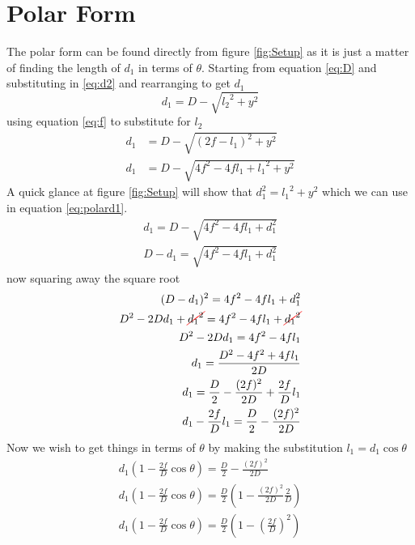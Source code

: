 \documentclass[a5paper,12pt]{article}
\begin{document}
\section{Polar Form}
The polar form can be found directly from figure \ref{fig:Setup} as it is just a matter of finding the length of $d_1$ in terms of $\theta$.
Starting from equation \ref{eq:D} and substituting in \ref{eq:d2} and rearranging to get $d_1$
\begin{equation}
d_1=D-\sqrt{{l_2}^2+y^2} 
\end{equation}
using equation \ref{eq:f} to substitute for $l_2$
\begin{subequations}
\begin{align}
d_1&=D-\sqrt{(2f-l_1)^2+y^2} \\
d_1&=D-\sqrt{4f^2 - 4fl_1 + {l_1}^2+y^2}  \label{eq:polard1}
\end{align}
\end{subequations}
A quick glance at figure \ref{fig:Setup} will show that $d_1^2={l_1}^2 + y ^2$ which we can use in equation \ref{eq:polard1}.
\begin{subequations}
\begin{align}
d_1=D-\sqrt{4f^2 - 4fl_1 + d_1^2 }\\
D-d_1=\sqrt{4f^2 - 4fl_1 + d_1^2 }
\end{align}
\end{subequations}
now squaring away the square root
\begin{subequations}
\begin{align}
(D-d_1)^2=4f^2 - 4fl_1 + d_1^2 \\
D^2-2Dd_1+\Ccancel[red]{{d_1}^2}=4f^2 - 4fl_1 + \Ccancel[red]{{d_1}^2}\\
D^2-2Dd_1=4f^2 - 4fl_1\\
d_1=\frac{D^2-4f^2 +  4fl_1}{2D} \\
d_1=\frac{D}{2}-\frac{(2f)^2}{2D} +  \frac{2f}{D}l_1\\
d_1-  \frac{2f}{D}l_1=\frac{D}{2}-\frac{(2f)^2}{2D} 
\end{align}
\end{subequations}
Now we wish to get things in terms of $\theta$ by making the substitution $l_1=d_1 \cos \theta$
\begin{subequations}
\begin{align}
d_1\left(1-  \frac{2f}{D}\cos \theta \right)=\frac{D}{2}-\frac{(2f)^2}{2D} \\
d_1\left(1-  \frac{2f}{D}\cos \theta \right)=\frac{D}{2}\left(1-\frac{(2f)^2}{2D}\frac{2}{D}\right) \\
d_1\left(1-  \frac{2f}{D}\cos \theta \right)=\frac{D}{2}\left(1-\left(\frac{2f}{D}\right)^2\right)
\end{align}
\end{subequations}
\end{document}
